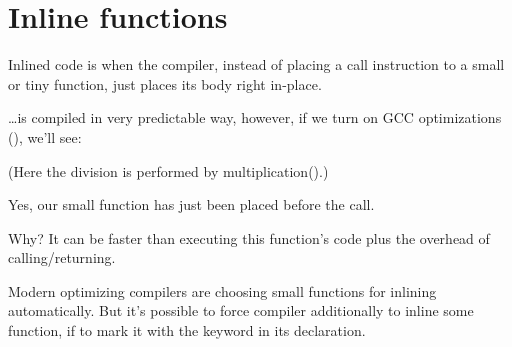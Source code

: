 \section{Inline functions}
\label{inline_code}

Inlined code is when the compiler, instead of placing a call instruction to a small or tiny function,
just places its body right in-place.



\dots is compiled in very predictable way, however, if we turn on GCC optimizations (\Othree), we'll see:



(Here the division is performed by multiplication().)

Yes, our small function  has just been placed before the \printf call.

Why? It can be faster than executing this function's code plus the overhead of calling/returning.

Modern optimizing compilers are choosing small functions for inlining automatically.
But it's possible to force compiler additionally to inline some function, if to mark
it with the  keyword in its declaration.


